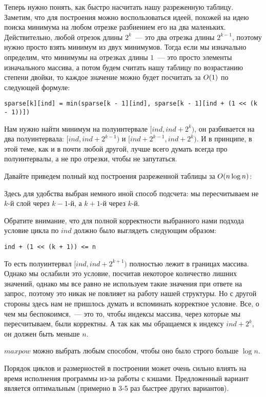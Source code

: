 Теперь нужно понять, как быстро насчитать нашу разреженную таблицу. Заметим, что для построения можно воспользоваться идеей, похожей на идею поиска минимума на любом отрезке разбиением его на два маленьких. Действительно, любой отрезок длины $2^{k}$~--- это два отрезка длины $2^{k - 1}$, поэтому нужно просто взять минимум из двух минимумов. Тогда если мы изначально определим, что минимумы на отрезках длины $1$~--- это просто элементы изначального массива, а потом будем считать нашу таблицу по возрастанию степени двойки, то каждое значение можно будет посчитать за $O(1)$ по следующей формуле:

\verb^sparse[k][ind] = min(sparse[k - 1][ind], sparse[k - 1][ind + (1 << (k - 1))])^

Нам нужно найти минимум на полуинтервале $[ind, ind + 2^k)$, он разбивается на два полуинтервала: $[ind, ind + 2^{k - 1})$ и $[ind + 2^{k - 1}, ind + 2^k)$. И в принципе, в этой теме, как и в почти любой другой, лучше всего думать всегда про полуинтервалы, а не про отрезки, чтобы не запутаться.

Давайте приведем полный код построения разреженной таблицы за $O(n \log n)$:



Здесь для удобства выбран немного иной способ подсчета: мы пересчитываем не $k$-й слой через $k-1$-й, а $k+1$-й через $k$-й.

Обратите внимание, что для полной корректности выбранного нами подхода условие цикла по $ind$ должно было выглядеть следующим образом:

\verb^ind + (1 << (k + 1)) <= n^

То есть полуинтервал $[ind, ind + 2^{k + 1})$ полностью лежит в границах массива. Однако мы ослабили это условие, посчитав некоторое количество лишних значений, однако мы все равно не используем такие значения при ответе на запрос, поэтому это никак не повлияет на работу нашей структуры. Но с другой стороны здесь нам не пришлось думать и вспоминать корректное условие. Все, о чем мы беспокоимся,~--- это то, чтобы индексы массива, через которые мы пересчитываем, были корректны. А так как мы обращаемся к индексу $ind + 2^k$, он должен быть меньше $n$.

$maxpow$ можно выбрать любым способом, чтобы оно было строго больше $\log n$.

\begin{observation}
    Порядок циклов и размерностей в построении может очень сильно влиять на время исполнения программы из-за работы с кэшами. Предложенный вариант является оптимальным (примерно в 3-5 раз быстрее других вариантов).
\end{observation}

